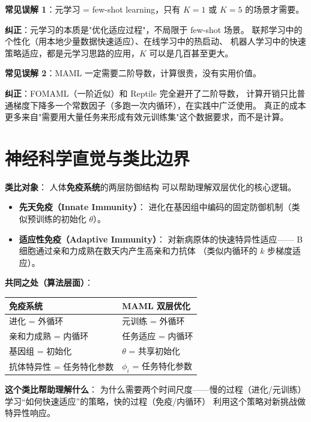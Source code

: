 \begin{misconceptionbox}
\textbf{常见误解 1}：元学习 = few-shot learning，只有 $K=1$ 或 $K=5$ 的场景才需要。

\textbf{纠正}：元学习的本质是"优化适应过程"，不局限于 few-shot 场景。
联邦学习中的个性化（用本地少量数据快速适应）、在线学习中的热启动、
机器人学习中的快速策略适应，都是元学习思路的应用，$K$ 可以是几百甚至更大。
\end{misconceptionbox}

\begin{misconceptionbox}
\textbf{常见误解 2}：MAML 一定需要二阶导数，计算很贵，没有实用价值。

\textbf{纠正}：FOMAML（一阶近似）和 Reptile 完全避开了二阶导数，
计算开销只比普通梯度下降多一个常数因子（多跑一次内循环），在实践中广泛使用。
真正的成本更多来自"需要用大量任务来形成有效元训练集"这个数据要求，而不是计算。
\end{misconceptionbox}

\section{神经科学直觉与类比边界}
\label{sec:bilevel_neuro}

\begin{neurosciencebox}[title=神经科学直觉：免疫系统的适应性学习]

\textbf{类比对象}：
人体\textbf{免疫系统}的两层防御结构
可以帮助理解双层优化的核心逻辑。

\begin{itemize}
  \item \textbf{先天免疫（Innate Immunity）}：
    进化在基因组中编码的固定防御机制（类似预训练的初始化 $\theta$）。
  \item \textbf{适应性免疫（Adaptive Immunity）}：
    对新病原体的快速特异性适应——
    B 细胞通过亲和力成熟在数天内产生高亲和力抗体
    （类似内循环的 $k$ 步梯度适应）。
\end{itemize}

\textbf{共同之处（算法层面）}：

\begin{center}
\begin{tabular}{p{5.5cm} p{5.5cm}}
\toprule
\textbf{免疫系统} & \textbf{MAML 双层优化} \\
\midrule
进化 = 外循环 & 元训练 = 外循环 \\
亲和力成熟 = 内循环 & 任务适应 = 内循环 \\
基因组 = 初始化 & $\theta$ = 共享初始化 \\
抗体特异性 = 任务特化参数 & $\phi_i$ = 任务特化参数 \\
\bottomrule
\end{tabular}
\end{center}

\textbf{这个类比帮助理解什么}：
为什么需要两个时间尺度——慢的过程（进化/元训练）
学习``如何快速适应''的策略，快的过程（免疫/内循环）
利用这个策略对新挑战做特异性响应。

\end{neurosciencebox}

